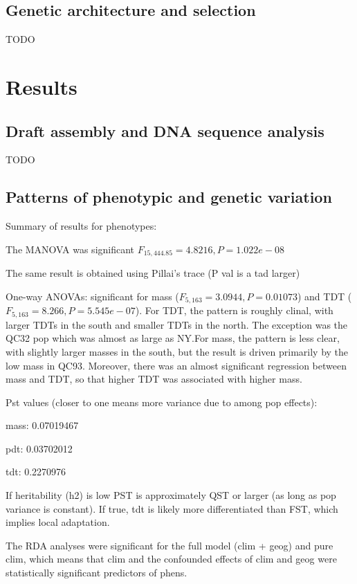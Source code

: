 \documentclass[smallextended]{svjour3}
\begin{document}
\subsection*{Genetic architecture and selection}
TODO

\section*{Results}

\subsection*{Draft assembly and DNA sequence analysis}
TODO

\subsection*{Patterns of phenotypic and genetic variation}
Summary of results for phenotypes:

The MANOVA was significant $F_{15,444.85} = 4.8216, P = 1.022e-08$

The same result is obtained using Pillai's trace (P val is a tad larger)

One-way ANOVAs: significant for mass ($F_{5,163} = 3.0944, P = 0.01073$) and TDT
($F_{5,163} = 8.266, P = 5.545e-07$). For TDT, the pattern is roughly clinal,
with larger TDTs in the south and smaller TDTs in the north. The exception was
the QC32 pop which was almost as large as NY.\@ For mass, the pattern is less
clear, with slightly larger masses in the south, but the result is driven
primarily by the low mass in QC93. Moreover, there was an almost significant
regression between mass and TDT, so that higher TDT was associated with higher
mass.

Pst values (closer to one means more variance due to among pop effects):

mass: 0.07019467

pdt: 0.03702012

tdt: 0.2270976

If heritability (h2) is low PST is approximately QST or larger (as long as pop
variance is constant). If true, tdt is likely more differentiated than FST,
which implies local adaptation.

The RDA analyses were significant for the full model (clim + geog) and pure
clim, which means that clim and the confounded effects of clim and geog were
statistically significant predictors of phens.
\end{document}
